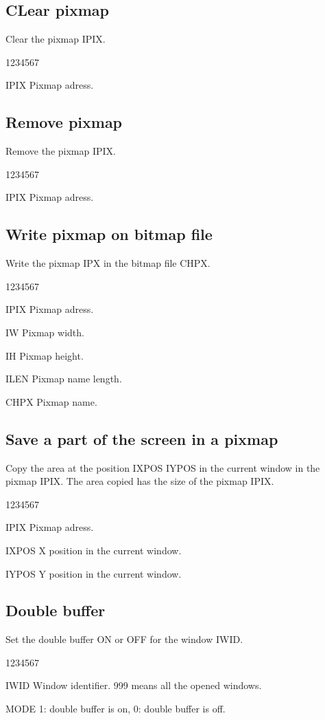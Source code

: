 \subsection{CLear pixmap}
%
\Action
Clear the pixmap IPIX.
\begin{DLtt}{1234567}
\item[IPIX] Pixmap adress.
\end{DLtt}

\subsection{Remove pixmap}
%
\Action
Remove the pixmap IPIX.
\begin{DLtt}{1234567}
\item[IPIX] Pixmap adress.
\end{DLtt}

\subsection{Write pixmap on bitmap file}
%
\Action
Write the pixmap IPX in the bitmap file CHPX.
\begin{DLtt}{1234567}
\item[IPIX] Pixmap adress.
\item[IW] Pixmap width.
\item[IH] Pixmap height.
\item[ILEN] Pixmap name length.
\item[CHPX] Pixmap name.
\end{DLtt}

\subsection{Save a part of the screen in a pixmap}
%
\Action
Copy the area at the position IXPOS IYPOS in the current
window in the pixmap IPIX. The area copied has the size
of the pixmap IPIX.
\begin{DLtt}{1234567}
\item[IPIX] Pixmap adress.
\item[IXPOS] X position in the current window.
\item[IYPOS] Y position in the current window.
\end{DLtt}

\newpage
\subsection{Double buffer}
%
Set the double buffer ON or OFF for the window IWID.
\begin{DLtt}{1234567}
\item[IWID] Window identifier. 999 means all the opened windows.
\item[MODE] 1: double buffer is on, 0: double buffer is off.
\end{DLtt}
%
%
